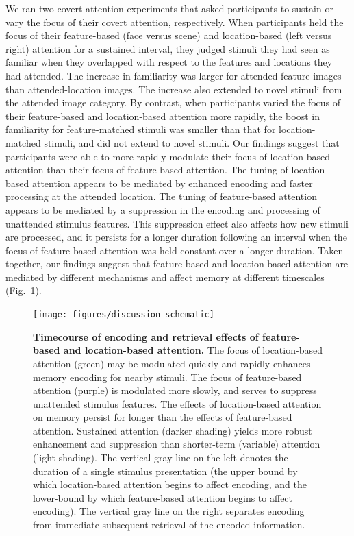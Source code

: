 \documentclass[english]{article}
\begin{document}
We ran two covert attention experiments that asked participants to sustain or
vary the focus of their covert attention, respectively. When participants held
the focus of their feature-based (face versus scene) and location-based (left
versus right) attention for a sustained interval, they judged stimuli they had
seen as familiar when they overlapped with respect to the features and
locations they had attended. The increase in familiarity was larger for
attended-feature images than attended-location images. The increase also
extended to novel stimuli from the attended image category. By contrast, when
participants varied the focus of their feature-based and location-based
attention more rapidly, the boost in familiarity for feature-matched stimuli
was smaller than that for location-matched stimuli, and did not extend to novel
stimuli. Our findings suggest that participants were able to more rapidly
modulate their focus of location-based attention than their focus of
feature-based attention. The tuning of location-based attention appears to be
mediated by enhanced encoding and faster processing at the attended location.
The tuning of feature-based attention appears to be mediated by a suppression
in the encoding and processing of unattended stimulus features. This
suppression effect also affects how new stimuli are processed, and it persists
for a longer duration following an interval when the focus of feature-based
attention was held constant over a longer duration. Taken together, our
findings suggest that feature-based and location-based attention are mediated
by different mechanisms and affect memory at different timescales
(Fig.~\ref{fig:model}).

\begin{figure}[tp]
  \centering \texttt{[image: figures/discussion\_schematic]}

  \caption{\textbf{Timecourse of encoding and retrieval effects of
  feature-based and location-based attention.} The focus of location-based
  attention (green) may be modulated quickly and rapidly enhances memory
  encoding for nearby stimuli. The focus of feature-based attention (purple) is
  modulated more slowly, and serves to suppress unattended stimulus features.
  The effects of location-based attention on memory persist for longer than the
  effects of feature-based attention. Sustained attention (darker shading)
  yields more robust enhancement and suppression than shorter-term (variable)
  attention (light shading). The vertical gray line on the left denotes the
  duration of a single stimulus presentation (the upper bound by which
  location-based attention begins to affect encoding, and the lower-bound by
  which feature-based attention begins to affect encoding). The vertical gray
  line on the right separates encoding from immediate subsequent retrieval of
  the encoded information.}

\label{fig:model}
\end{figure}
\end{document}
